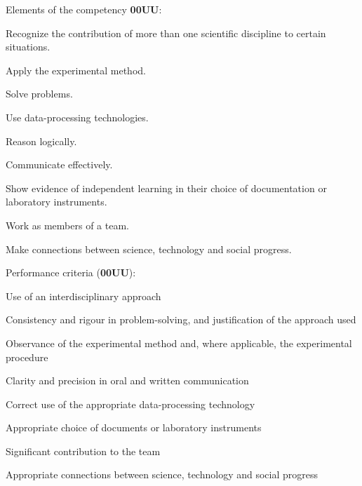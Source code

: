 {\begin{multicols}{2}
		\vfill
		\columnbreak

		Elements of the competency \textbf{00UU}:
		\begin{compactenum}
			\item Recognize the contribution of more than one
			scientific discipline to certain situations.
			\item Apply the experimental method.
			\item Solve problems.
			\item Use data-processing technologies.
			\item Reason logically.
			\item Communicate effectively.
			\item Show evidence of independent learning in their choice of documentation or laboratory instruments.
			\item Work as members of a team.
			\item Make connections between science, technology and social progress. \\
		\end{compactenum}

		Performance criteria (\textbf{00UU}):
		\begin{compactitem}
			\item Use of an interdisciplinary approach
			\item Consistency and rigour in problem-solving, and justification of the approach used
			\item Observance of the experimental method and, where applicable, the experimental procedure
			\item Clarity and precision in oral and written communication
			\item Correct use of the appropriate data-processing technology
			\item Appropriate choice of documents or laboratory instruments
			\item Significant contribution to the team
			\item Appropriate connections between science, technology and social progress
		\end{compactitem}
	\end{multicols}
}
